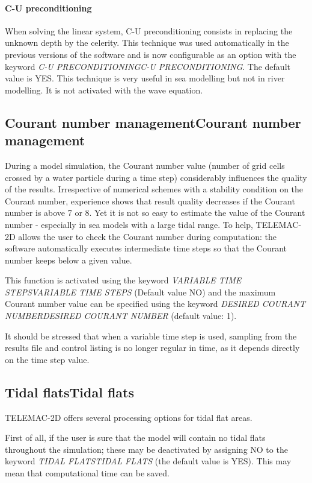 \documentclass{article} %
\begin{document}
\paragraph{ C-U preconditioning}

 When solving the linear system, C-U preconditioning consists in replacing the unknown depth by the celerity. This technique was used automatically in the previous versions of the software and is now configurable as an option with the keyword \textit{C-U PRECONDITIONINGC-U PRECONDITIONING}. The default value is YES. This technique is very useful in sea modelling but not in river modelling. It is not activated with the wave equation.


\subsection{ Courant number managementCourant number management}

 During a model simulation, the Courant number value (number of grid cells crossed by a water particle during a time step) considerably influences the quality of the results. Irrespective of numerical schemes with a stability condition on the Courant number, experience shows that result quality decreases if the Courant number is above 7 or 8. Yet it is not so easy to estimate the value of the Courant number - especially in sea models with a large tidal range. To help, TELEMAC-2D allows the user to check the Courant number during computation: the software automatically executes intermediate time steps so that the Courant number keeps below a given value.

 This function is activated using the keyword \textit{VARIABLE TIME STEPSVARIABLE TIME STEPS} (Default value NO) and the maximum Courant number value can be specified using the keyword \textit{DESIRED COURANT NUMBERDESIRED COURANT NUMBER} (default value: 1).

 It should be stressed that when a variable time step is used, sampling from the results file and control listing is no longer regular in time, as it depends directly on the time step value.


\subsection{ Tidal flatsTidal flats}

 TELEMAC-2D offers several processing options for tidal flat areas.

 First of all, if the user is sure that the model will contain no tidal flats throughout the simulation; these may be deactivated by assigning NO to the keyword \textit{TIDAL FLATSTIDAL FLATS} (the default value is YES). This may mean that computational time can be saved.
\end{document}
